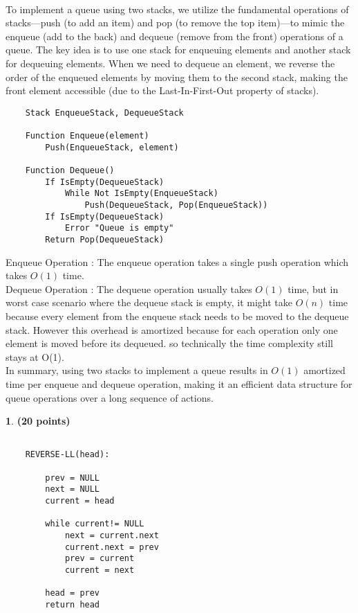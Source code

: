 \documentclass[11pt]{article}
\theoremstyle{definition}
\newtheorem{prob}{}
\newcommand{\solution}{\medskip\noindent{\color{DarkBlue}\textbf{Solution:}}}
\begin{document}
\solution \\


To implement a queue using two stacks, we utilize the fundamental operations of stacks—push (to add an item) and pop (to remove the top item)—to mimic the enqueue (add to the back) and 
dequeue (remove from the front) operations of a queue. The key idea is to use one stack for enqueuing elements and another stack for dequeuing elements. When we need to dequeue an element, 
we reverse the order of the enqueued elements by moving them to the second stack, making the front element accessible (due to the Last-In-First-Out property of stacks). \\

\begin{verbatim}
    Stack EnqueueStack, DequeueStack

    Function Enqueue(element)
        Push(EnqueueStack, element)

    Function Dequeue()
        If IsEmpty(DequeueStack)
            While Not IsEmpty(EnqueueStack)
                Push(DequeueStack, Pop(EnqueueStack))
        If IsEmpty(DequeueStack)
            Error "Queue is empty"
        Return Pop(DequeueStack)

\end{verbatim}

Enqueue Operation : The enqueue operation takes a single push operation which takes $O(1)$ time. \\

Dequeue Operation : The dequeue operation usually takes $O(1)$ time, but in worst case scenario where the dequeue stack is empty,
it might take $O(n)$ time because every element from the enqueue stack needs to be moved to the dequeue stack. However this overhead 
is amortized because for each operation only one element is moved before its dequeued. so technically the time complexity still stays at O(1). \\

In summary, using two stacks to implement a queue results in $O(1)$ amortized time per enqueue and dequeue operation, making it an efficient data structure for queue operations over a long sequence of actions.

\begin{prob} \textbf{(20 points)}
\end{prob}

\solution

\begin{verbatim}
    
    REVERSE-LL(head):

        prev = NULL
        next = NULL
        current = head

        while current!= NULL
            next = current.next
            current.next = prev
            prev = current
            current = next
        
        head = prev
        return head

\end{verbatim}
\end{document}
